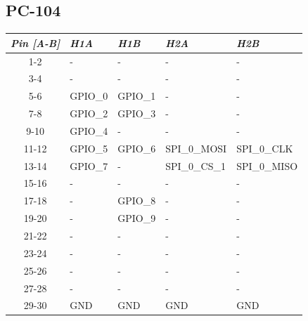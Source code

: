 \subsection{PC-104}

\begin{table}[!h]
    \centering
    \begin{tabular}{cllll}
        \toprule[1.5pt]
        \textit{Pin [A-B]} & \textit{H1A}     & \textit{H1B}     & \textit{H2A}  & \textit{H2B}  \\
        \midrule
        1-2                & -                & -                & -             & -             \\
        3-4                & -                & -                & -             & -             \\
        5-6                & GPIO\_0          & GPIO\_1          & -             & -             \\
        7-8                & GPIO\_2          & GPIO\_3          & -             & -             \\
        9-10               & GPIO\_4          & -                & -             & -             \\
        11-12              & GPIO\_5          & GPIO\_6          & SPI\_0\_MOSI  & SPI\_0\_CLK   \\
        13-14              & GPIO\_7          & -                & SPI\_0\_CS\_1 & SPI\_0\_MISO  \\
        15-16              & -                & -                & -             & -             \\
        17-18              & -                & GPIO\_8          & -             & -             \\
        19-20              & -                & GPIO\_9          & -             & -             \\
        21-22              & -                & -                & -             & -             \\
        23-24              & -                & -                & -             & -             \\
        25-26              & -                & -                & -             & -             \\
        27-28              & -                & -                & -             & -             \\
        29-30              & GND              & GND              & GND           & GND           \\

\end{tabular}
\end{table}
